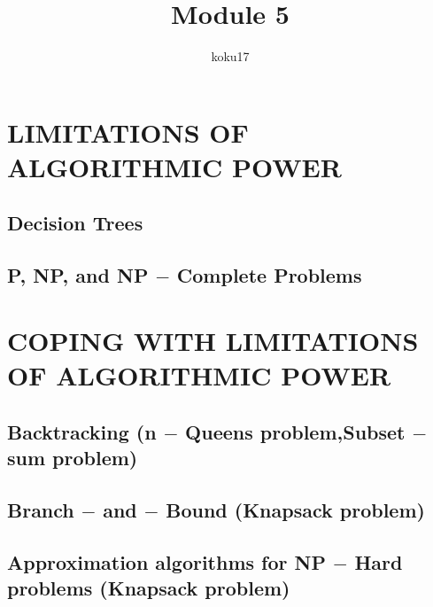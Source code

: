 \documentclass{article}
\author{koku17}
\title{Module 5}
\begin{document}
	\maketitle \thispagestyle{empty} \newpage
	\tableofcontents \thispagestyle{empty} \newpage \setcounter{page}{1}
	\section{LIMITATIONS OF ALGORITHMIC POWER}
	\subsection{Decision Trees}
	\subsection{P, NP, and NP $-$ Complete Problems}

	\section{COPING WITH LIMITATIONS OF ALGORITHMIC POWER}
	\subsection{Backtracking (n $-$ Queens problem,Subset $-$ sum problem)}
	\subsection{Branch $-$ and $-$ Bound (Knapsack problem)}
	\subsection{Approximation algorithms for NP $-$ Hard problems (Knapsack problem)}
\end{document}
